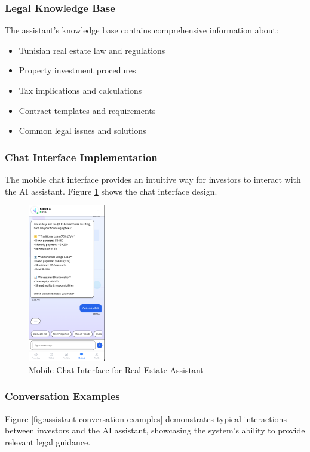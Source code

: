 \subsubsection{Legal Knowledge Base}
The assistant's knowledge base contains comprehensive information about:
\begin{itemize}
    \item Tunisian real estate law and regulations
    \item Property investment procedures
    \item Tax implications and calculations
    \item Contract templates and requirements
    \item Common legal issues and solutions
\end{itemize}

\subsubsection{Chat Interface Implementation}
The mobile chat interface provides an intuitive way for investors to interact with the AI assistant. Figure \ref{fig:assistant-mobile-chat} shows the chat interface design.

\begin{figure}[htbp]
    \centering
    \includegraphics[width=0.3\textwidth]{images/assistant_mobile_chat.png}
    \caption{Mobile Chat Interface for Real Estate Assistant}
    \label{fig:assistant-mobile-chat}
\end{figure}

\subsubsection{Conversation Examples}
Figure \ref{fig:assistant-conversation-examples} demonstrates typical interactions between investors and the AI assistant, showcasing the system's ability to provide relevant legal guidance.

